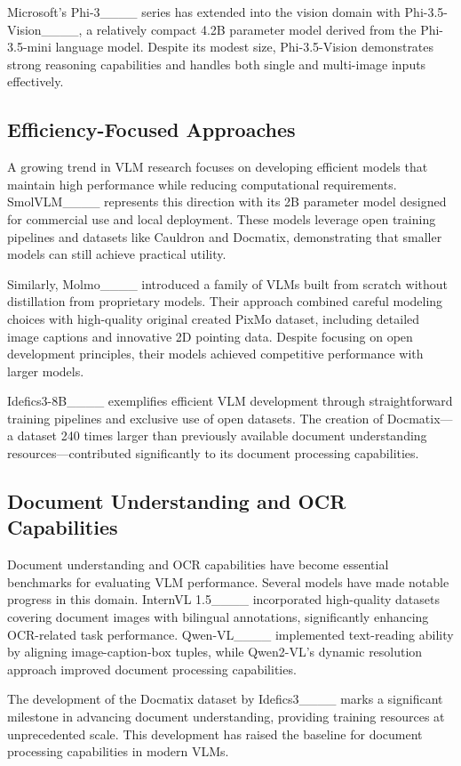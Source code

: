 Microsoft's Phi-3____ series has extended into the vision domain with Phi-3.5-Vision____, a relatively compact 4.2B parameter model derived from the Phi-3.5-mini language model. Despite its modest size, Phi-3.5-Vision demonstrates strong reasoning capabilities and handles both single and multi-image inputs effectively. 

\subsection{Efficiency-Focused Approaches}
A growing trend in VLM research focuses on developing efficient models that maintain high performance while reducing computational requirements. SmolVLM____ represents this direction with its 2B parameter model designed for commercial use and local deployment. These models leverage open training pipelines and datasets like Cauldron and Docmatix, demonstrating that smaller models can still achieve practical utility. 

Similarly, Molmo____ introduced a family of VLMs built from scratch without distillation from proprietary models. Their approach combined careful modeling choices with high-quality original created PixMo dataset, including detailed image captions and innovative 2D pointing data. Despite focusing on open development principles, their models achieved competitive performance with larger models. 

Idefics3-8B____ exemplifies efficient VLM development through straightforward training pipelines and exclusive use of open datasets. The creation of Docmatix—a dataset 240 times larger than previously available document understanding resources—contributed significantly to its document processing capabilities. 

\subsection{Document Understanding and OCR Capabilities }
Document understanding and OCR capabilities have become essential benchmarks for evaluating VLM performance. Several models have made notable progress in this domain. InternVL 1.5____ incorporated high-quality datasets covering document images with bilingual annotations, significantly enhancing OCR-related task performance. Qwen-VL____ implemented text-reading ability by aligning image-caption-box tuples, while Qwen2-VL's dynamic resolution approach improved document processing capabilities. 

The development of the Docmatix dataset by Idefics3____ marks a significant milestone in advancing document understanding, providing training resources at unprecedented scale. This development has raised the baseline for document processing capabilities in modern VLMs.  

